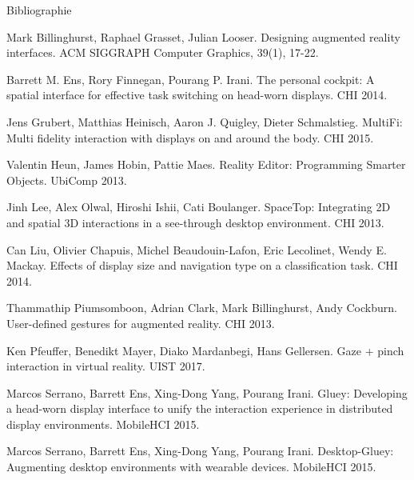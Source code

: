 \begin{frame}[allowframebreaks]{Bibliographie}
  \begin{thebibliography}{10}
      Mark Billinghurst, Raphael Grasset, Julian Looser.
      \newblock Designing augmented reality interfaces.
      \newblock ACM SIGGRAPH Computer Graphics, 39(1), 17-22.

      Barrett M. Ens, Rory Finnegan, Pourang P. Irani.
      \newblock The personal cockpit: A spatial interface for effective task switching on head-worn displays.
      \newblock CHI 2014.

      Jens Grubert, Matthias Heinisch, Aaron J. Quigley, Dieter Schmalstieg.
      \newblock MultiFi: Multi fidelity interaction with displays on and around the body.
      \newblock CHI 2015.

      Valentin Heun, James Hobin, Pattie Maes.
      \newblock Reality Editor: Programming Smarter Objects.
      \newblock UbiComp 2013.

      Jinh Lee, Alex Olwal, Hiroshi Ishii, Cati Boulanger.
      \newblock SpaceTop: Integrating 2D and spatial 3D interactions in a see-through desktop environment.
      \newblock CHI 2013.

      Can Liu, Olivier Chapuis, Michel Beaudouin-Lafon, Eric Lecolinet, Wendy E. Mackay.
      \newblock Effects of display size and navigation type on a classification task.
      \newblock CHI 2014.

      Thammathip Piumsomboon, Adrian Clark, Mark Billinghurst, Andy Cockburn.
      \newblock User-defined gestures for augmented reality.
      \newblock CHI 2013.

      Ken Pfeuffer, Benedikt Mayer, Diako Mardanbegi, Hans Gellersen.
      \newblock Gaze + pinch interaction in virtual reality.
      \newblock UIST 2017.

      Marcos Serrano, Barrett Ens, Xing-Dong Yang, Pourang Irani.
      \newblock Gluey: Developing a head-worn display interface to unify the interaction experience in distributed display environments.
      \newblock MobileHCI 2015.

      Marcos Serrano, Barrett Ens, Xing-Dong Yang, Pourang Irani.
      \newblock Desktop-Gluey: Augmenting desktop environments with wearable devices.
      \newblock MobileHCI 2015.


\end{thebibliography}
\end{frame}
